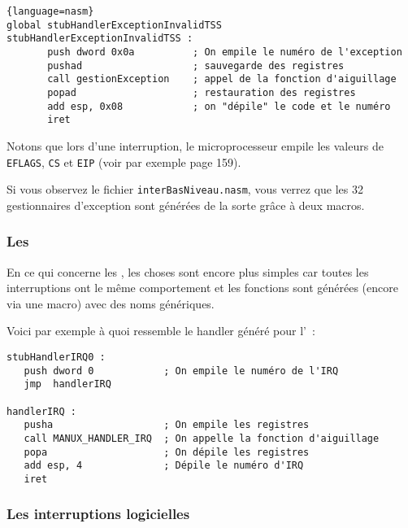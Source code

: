 \begin{itemize}
\begin{lstlisting}{language=nasm}
global stubHandlerExceptionInvalidTSS
stubHandlerExceptionInvalidTSS :
       push dword 0x0a          ; On empile le numéro de l'exception
       pushad                   ; sauvegarde des registres
       call gestionException    ; appel de la fonction d'aiguillage
       popad                    ; restauration des registres
       add esp, 0x08            ; on "dépile" le code et le numéro
       iret
\end{lstlisting}

   Notons que lors d'une interruption, le microprocesseur empile les
valeurs de {\tt EFLAGS}, {\tt CS} et {\tt EIP} (voir par exemple
\cite{intel386pru1986} page 159).

   Si vous observez le fichier \lstinline!interBasNiveau.nasm!, vous
verrez que les 32 gestionnaires d'exception sont générées de la sorte
grâce à deux macros.

%
\subsubsection{Les \irq}

   En ce qui concerne les \irq, les choses sont encore plus simples
car toutes les interruptions ont le même comportement et les fonctions
sont générées (encore via une macro) avec des noms génériques.

   Voici par exemple à quoi ressemble le handler généré pour l'~:
   
\begin{lstlisting}
stubHandlerIRQ0 :
   push dword 0            ; On empile le numéro de l'IRQ
   jmp  handlerIRQ

handlerIRQ :
   pusha                   ; On empile les registres
   call MANUX_HANDLER_IRQ  ; On appelle la fonction d'aiguillage
   popa                    ; On dépile les registres
   add esp, 4              ; Dépile le numéro d'IRQ
   iret
\end{lstlisting}

%
\subsubsection{Les interruptions logicielles}


\end{itemize}
